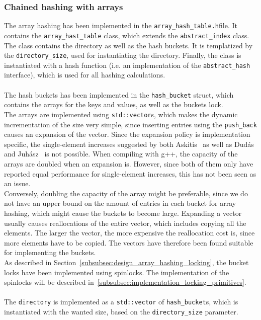 \documentclass[11pt]{article} %
\begin{document}
\subsubsection{Chained hashing with arrays}
\label{subsubsec:implementation_array_hashing}
The array hashing has been implemented in the \verb|array_hash_table.h|file. It contains the \verb|array_hast_table| class, which extends the \verb|abstract_index| class. The class contains the directory as well as the hash buckets. It is templatized by the \verb|directory_size|, used for instantiating the directory. Finally, the class is instantiated with a hash function (i.e. an implementation of the \verb|abstract_hash| interface), which is used for all hashing calculations.\\
\\
The hash buckets has been implemented in the \verb|hash_bucket| struct, which contains the arrays for the keys and values, as well as the buckets lock.\\
The arrays are implemented using \verb|std::vector|s, which makes the dynamic incrementation of the size very simple, since inserting entries using the \verb|push_back| causes an expansion of the vector. Since the expansion policy is implementation specific, the single-element increases suggested by both Askitis~\cite{NA09} as well as Dudás and Juhász~\cite{ADSJ13} is not possible. When compiling with g++, the capacity of the arrays are doubled when an expansion is. However, since both of them only have reported equal performance for single-element increases, this has not been seen as an issue. \\Conversely, doubling the capacity of the array might be preferable, since we do not have an upper bound on the amount of entries in each bucket for array hashing, which might cause the buckets to become large. Expanding a vector usually causes reallocations of the entire vector, which includes copying all the elements. The larger the vector, the more expensive the reallocation cost is, since more elements have to be copied. The vectors have therefore been found suitable for implementing the buckets.\\
As described in Section~\ref{subsubsec:design_array_hashing_locking}, the bucket locks have been implemented using spinlocks. The implementation of the spinlocks will be described in~\ref{subsubsec:implementation_locking_primitives}.\\
\\
The \verb|directory| is implemented as a \verb|std::vector| of \verb|hash_bucket|s, which is instantiated with the wanted size, based on the \verb|directory_size| parameter.\\
\end{document}
